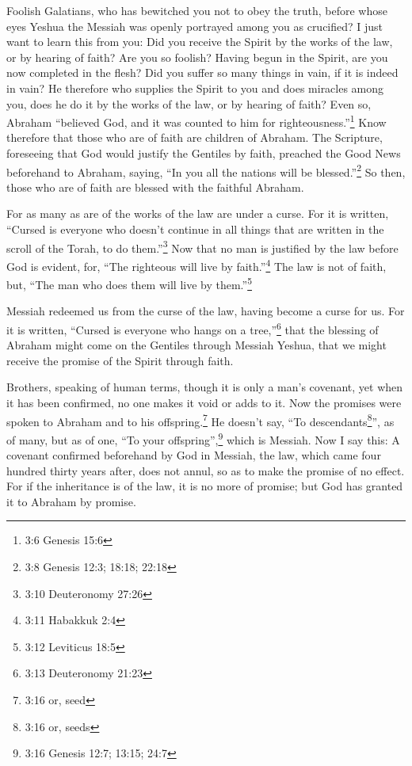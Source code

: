 \mychapter{} \myverse*{}Foolish Galatians, who has bewitched you not to obey the truth,
before whose eyes Yeshua the Messiah was openly portrayed among you as crucified?
\myverse{}I just want to learn this from you: Did you receive the Spirit by the works
of the law, or by hearing of faith?
\myverse{}Are you so foolish? Having begun in the Spirit, are you now completed in the
flesh?
\myverse{}Did you suffer so many things in vain, if it is indeed in vain?
\myverse{}He therefore who supplies the Spirit to you and does miracles among you, does
he do it by the works of the law, or by hearing of faith?
\myverse{}Even so, Abraham “believed God, and it was counted to him for righteousness.”\footnote{3:6 Genesis 15:6}
\myverse{}Know therefore that those who are of faith are children of Abraham.
\myverse{}The Scripture, foreseeing that God would justify the Gentiles by faith, preached
the Good News beforehand to Abraham, saying, “In you all the nations will be blessed.”\footnote{3:8 Genesis 12:3;
	18:18;
	22:18}
\myverse{}So then, those who are of faith are blessed with the faithful Abraham.

\myverse{}For as many as are of the works of the law are under a curse.
For it is written, “Cursed is everyone who doesn’t continue in all things that are written in the scroll of the Torah,
to do them.”\footnote{3:10 Deuteronomy 27:26}
\myverse{}Now that no man is justified by the law before God is evident, for, “The righteous
will live by faith.”\footnote{3:11 Habakkuk 2:4}
\myverse{}The law is not of faith, but, “The man who does them will live by them.”\footnote{3:12 Leviticus 18:5}

\myverse{}Messiah redeemed us from the curse of the law, having become
a curse for us. For it is written, “Cursed is everyone who hangs on a tree,”\footnote{3:13 Deuteronomy 21:23}
\myverse{}that the blessing of Abraham might come on the Gentiles through Messiah Yeshua,
that we might receive the promise of the Spirit through faith.

\myverse{}Brothers, speaking of human terms, though it is only a man’s
covenant, yet when it has been confirmed, no one makes it void or adds to it.
\myverse{}Now the promises were spoken to Abraham and to his offspring.\footnote{3:16 or, seed} He doesn’t say, “To descendants\footnote{3:16 or, seeds}”, as of many, but as of one, “To your offspring”,\footnote{3:16 Genesis 12:7;
	13:15;
	24:7} which is Messiah.
\myverse{}Now I say this: A covenant confirmed beforehand by God in Messiah, the law,
which came four hundred thirty years after, does not annul, so as to make the promise of no effect.
\myverse{}For if the inheritance is of the law, it is no more of promise; but God has
granted it to Abraham by promise.

